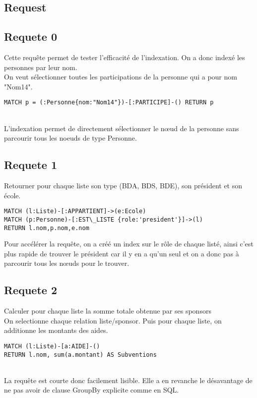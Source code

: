 \documentclass[a4paper,oneside,1pt]{article}
\begin{document}
\subsection{Request}


\subsection{Requete 0}
Cette requête permet de tester l'efficacité de l'indexation. On a donc indexé les personnes par leur nom.
\\
On veut sélectionner toutes les participations de la personne qui a pour nom "Nom14". 
\\
\begin{verbatim}
MATCH p = (:Personne{nom:"Nom14"})-[:PARTICIPE]-() RETURN p
\end{verbatim}
\\L'indexation permet de directement sélectionner le nœud de la personne sans parcourir tous les noeuds de type Personne.

\subsection{Requete 1}
Retourner pour chaque liste son type (BDA, BDS, BDE), son président et son école.
\\
\begin{verbatim}
MATCH (l:Liste)-[:APPARTIENT]->(e:Ecole)
MATCH (p:Personne)-[:EST\_LISTE {role:'president'}]->(l)
RETURN l.nom,p.nom,e.nom
\end{verbatim}

Pour accélérer la requête, on a créé un index sur le rôle de chaque listé, ainsi c'est plus rapide de trouver le président car il y en a qu'un seul et on a donc pas à parcourir tous les nœuds pour le trouver.


\subsection{Requete 2}
Calculer pour chaque liste la somme totale obtenue par ses sponsors
\\
On selectionne chaque relation liste/sponsor. Puis pour chaque liste, on additionne les montants des aides.
\\
\begin{verbatim}
MATCH (l:Liste)-[a:AIDE]-() 
RETURN l.nom, sum(a.montant) AS Subventions
\end{verbatim}
\\
La requête est courte donc facilement lisible. Elle a en revanche le désavantage de ne pas avoir de clause GroupBy explicite comme en SQL.
\end{document}
